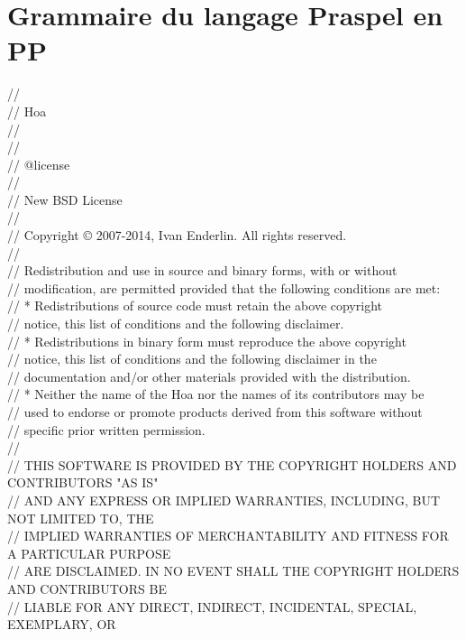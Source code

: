 \section{Grammaire du langage Praspel en PP}
\label{appendices:grammar_of_praspel}

\begin{bigbigpre}
// \\
// Hoa \\
// \\
// \\
// @license \\
// \\
// New BSD License \\
// \\
// Copyright © 2007-2014, Ivan Enderlin. All rights reserved. \\
// \\
// Redistribution and use in source and binary forms, with or without \\
// modification, are permitted provided that the following conditions are met: \\
//     * Redistributions of source code must retain the above copyright \\
//       notice, this list of conditions and the following disclaimer. \\
//     * Redistributions in binary form must reproduce the above copyright \\
//       notice, this list of conditions and the following disclaimer in the \\
//       documentation and/or other materials provided with the distribution. \\
//     * Neither the name of the Hoa nor the names of its contributors may be \\
//       used to endorse or promote products derived from this software without \\
//       specific prior written permission. \\
// \\
// THIS SOFTWARE IS PROVIDED BY THE COPYRIGHT HOLDERS AND CONTRIBUTORS "AS IS" \\
// AND ANY EXPRESS OR IMPLIED WARRANTIES, INCLUDING, BUT NOT LIMITED TO, THE \\
// IMPLIED WARRANTIES OF MERCHANTABILITY AND FITNESS FOR A PARTICULAR PURPOSE \\
// ARE DISCLAIMED. IN NO EVENT SHALL THE COPYRIGHT HOLDERS AND CONTRIBUTORS BE \\
// LIABLE FOR ANY DIRECT, INDIRECT, INCIDENTAL, SPECIAL, EXEMPLARY, OR \\

\end{bigbigpre}
